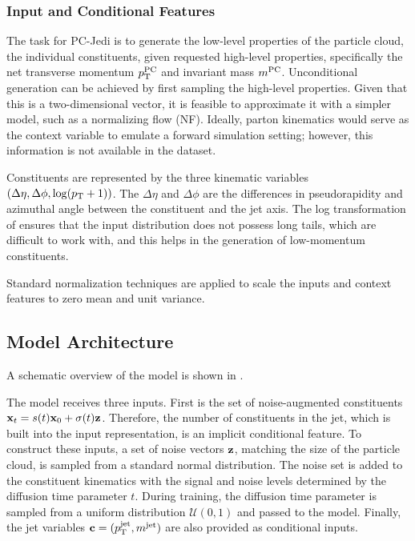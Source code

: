 \subsubsection{Input and Conditional Features}

The task for PC-Jedi is to generate the low-level properties of the particle cloud, the individual constituents, given requested high-level properties, specifically the net transverse momentum $p_\mathrm{T}^{\text{PC}}$ and invariant mass $m^{\text{PC}}$.
Unconditional generation can be achieved by first sampling the high-level properties.
Given that this is a two-dimensional vector, it is feasible to approximate it with a simpler model, such as a normalizing flow (NF).
Ideally, parton kinematics would serve as the context variable to emulate a forward simulation setting; however, this information is not available in the dataset.

Constituents are represented by the three kinematic variables $\left(\Delta\eta, \Delta\phi, \log(p_\mathrm{T} + 1)\right)$.
The $\Delta\eta$ and $\Delta\phi$ are the differences in pseudorapidity and azimuthal angle between the constituent and the jet axis.
The log transformation of \pt ensures that the input distribution does not possess long tails, which are difficult to work with, and this helps in the generation of low-momentum constituents.

Standard normalization techniques are applied to scale the inputs and context features to zero mean and unit variance.

\subsection{Model Architecture}

A schematic overview of the \pcjedi model is shown in .

The model receives three inputs.
First is the set of noise-augmented constituents $\mathbf{x}_t = s(t) \mathbf{x}_0 + \sigma(t) \mathbf{z}$.
Therefore, the number of constituents in the jet, which is built into the input representation, is an implicit conditional feature.
To construct these inputs, a set of noise vectors $\mathbf{z}$, matching the size of the particle cloud, is sampled from a standard normal distribution.
The noise set is added to the constituent kinematics with the signal and noise levels determined by the diffusion time parameter $t$.
During training, the diffusion time parameter is sampled from a uniform distribution $\mathcal{U}(0, 1)$ and passed to the model.
Finally, the jet variables $\mathbf{c} = (p_\mathrm{T}^{\text{jet}}, m^{\text{jet}})$ are also provided as conditional inputs.

